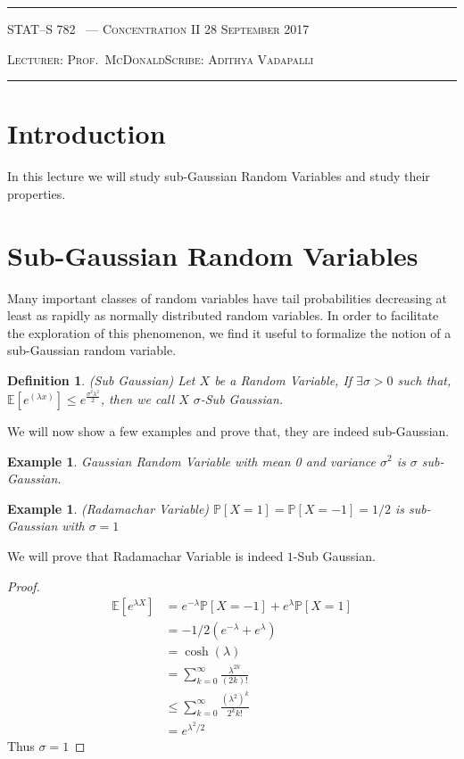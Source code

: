 \documentclass[10pt]{article}
\newcounter{lecnum}
\newtheorem{definition}[def]{Definition}
\newtheorem{example}[ex]{Example}
\renewcommand{\P}{\mathbb{P}}
\newcommand{\lecturer}{Prof.\ McDonald}
\newcommand{\scribe}{Adithya Vadapalli}
\newcommand{\chtitle}{Concentration II}
\newcommand{\lecdate}{28 September 2017}
\begin{document}
	\rule{6.5in}{1pt}
	
	\textsc{STAT--S 782
		\hfill \thelecnum\ --- \chtitle
		\hfill \lecdate}
	
	\textsc{Lecturer: \lecturer \hfill Scribe: \scribe}
	\rule{6.5in}{1pt}
	
	
	\section*{Introduction}
	In this lecture we will study sub-Gaussian Random Variables and study their properties.
	
	\section{Sub-Gaussian Random Variables}
	Many important classes of random variables have tail probabilities decreasing at
	least as rapidly as normally distributed random variables. In order to facilitate
	the exploration of this phenomenon, we find it useful to formalize the notion of a
	sub-Gaussian random variable.
	\begin{definition} (Sub Gaussian)
		Let $X$ be a Random Variable, If $\exists \sigma > 0$ such that, $\mathbb{E}[e^{(\lambda x)}] \le e^{\frac{\sigma^2 \lambda^2}{2}}$, then we call $X$ $\sigma$-Sub Gaussian.
	\end{definition}
	We will now show a few examples and prove that, they are indeed sub-Gaussian.
	\begin{example}
		Gaussian Random Variable with mean 0 and variance $\sigma^{2}$ is $\sigma$ sub-Gaussian.
	\end{example}

    \begin{example}(Radamachar Variable)
    	$\P[X = 1] = \P[X = -1] = 1/2$ is sub-Gaussian with $\sigma = 1$
    \end{example}
	
	We will prove that Radamachar Variable is indeed $1$-Sub Gaussian. 
	\begin{proof}
		\begin{align*} 
		\mathbb{E}[e^{\lambda X}] &= e^{-\lambda} \P[X = -1] + e^{\lambda} \P[X = 1] \\ 
		 &=  -1/2(e^{-\lambda} + e^{\lambda}) \\
		 &= \cosh(\lambda) \\
		 &= \sum_{k=0}^{\infty} \frac{\lambda^{2k}}{(2k)!} \\
		 &\le \sum_{k=0}^{\infty} \frac{(\lambda^{2})^{k}}{2^{k} k!} \\
		 &= e^{\lambda^{2}/2}
		\end{align*}
		Thus $\sigma = 1$
	\end{proof} 
	
\end{document}
